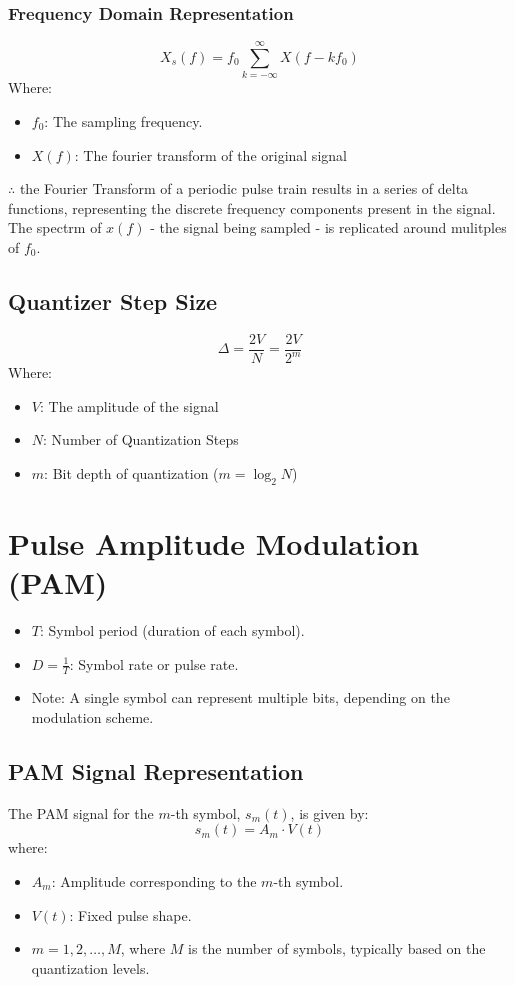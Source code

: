 \documentclass[10pt]{article}
\begin{document}
\subsubsection{Frequency Domain Representation}
\[
    X_s(f) = f_0 \sum_{k=-\infty}^{\infty} X(f-k f_0)
\]
\noindent Where:
\begin{itemize}
    \item $f_0$: The sampling frequency.
    \item $X(f)$: The fourier transform of the original signal
\end{itemize}

\noindent $\therefore$ the Fourier Transform of a periodic pulse train results in a series of delta functions, representing the discrete frequency components present in the signal. The spectrm of $x(f)$ - the signal being sampled - is replicated around mulitples of $f_0$.

\subsection{Quantizer Step Size}
\[
    \Delta = \frac{2V}{N} = \frac{2V}{2^m}
\]
\noindent Where:
\begin{itemize}
    \item $V$: The amplitude of the signal
    \item $N$: Number of Quantization Steps
    \item $m$: Bit depth of quantization ($m=\log_2{N}$)
\end{itemize}

\section{Pulse Amplitude Modulation (PAM)}

\begin{itemize}
    \item \( T \): Symbol period (duration of each symbol).
    \item \( D = \frac{1}{T} \): Symbol rate or pulse rate.

    \item Note: A single symbol can represent multiple bits, depending on the modulation scheme.
\end{itemize}

\subsection{PAM Signal Representation}
The PAM signal for the \( m \)-th symbol, \( s_m(t) \), is given by:
\[
s_m(t) = A_m \cdot V(t)
\]
where:
\begin{itemize}
    \item \( A_m \): Amplitude corresponding to the \( m \)-th symbol.
    \item \( V(t) \): Fixed pulse shape.
    \item \( m = 1, 2, \dots, M \), where \( M \) is the number of symbols, typically based on the quantization levels.
\end{itemize}
\end{document}
